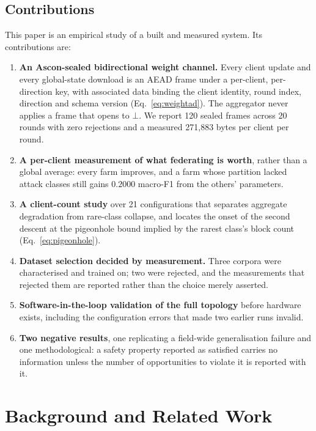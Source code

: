 \documentclass[conference]{IEEEtran}
\begin{document}
\subsection{Contributions}
This paper is an empirical study of a built and measured system. Its contributions are:

\begin{enumerate}
  \item \textbf{An Ascon-sealed bidirectional weight channel.} Every client update and every
  global-state download is an AEAD frame under a per-client, per-direction key, with associated
  data binding the client identity, round index, direction and schema version
  (Eq.~\eqref{eq:weightad}). The aggregator never applies a frame that opens to $\bot$. We
  report 120 sealed frames across 20 rounds with zero rejections and a measured
  271{,}883 bytes per client per round.
  \item \textbf{A per-client measurement of what federating is worth}, rather than a global
  average: every farm improves, and a farm whose partition lacked attack classes still gains
  $0.2000$ macro-F1 from the others' parameters.
  \item \textbf{A client-count study} over 21 configurations that separates aggregate
  degradation from rare-class collapse, and locates the onset of the second descent at the
  pigeonhole bound implied by the rarest class's block count (Eq.~\eqref{eq:pigeonhole}).
  \item \textbf{Dataset selection decided by measurement.} Three corpora were characterised and
  trained on; two were rejected, and the measurements that rejected them are reported rather
  than the choice merely asserted.
  \item \textbf{Software-in-the-loop validation of the full topology} before hardware exists,
  including the configuration errors that made two earlier runs invalid.
  \item \textbf{Two negative results}, one replicating a field-wide generalisation failure and
  one methodological: a safety property reported as satisfied carries no information unless the
  number of opportunities to violate it is reported with it.
\end{enumerate}

\section{Background and Related Work}
\end{document}
